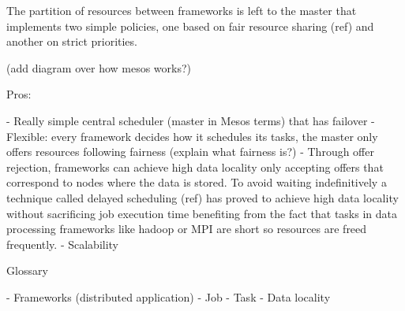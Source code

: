 The partition of resources between frameworks is left to the master
that implements two simple policies, one based on fair resource
sharing (ref) and another on strict priorities.

(add diagram over how mesos works?)


Pros:

- Really simple central scheduler (master in Mesos terms) that has
  failover 
- Flexible: every framework decides how it schedules its tasks, the
master only offers resources following fairness (explain what fairness is?)
- Through offer rejection, frameworks can achieve high data locality
only accepting offers that correspond to nodes where the data is
stored. To avoid waiting indefinitively a technique called delayed
scheduling (ref) has proved to achieve high data locality without
sacrificing job execution time benefiting from the fact that tasks in
data processing frameworks like hadoop or MPI are short so resources
are freed frequently.
- Scalability



Glossary

- Frameworks (distributed application)
- Job
- Task
- Data locality

